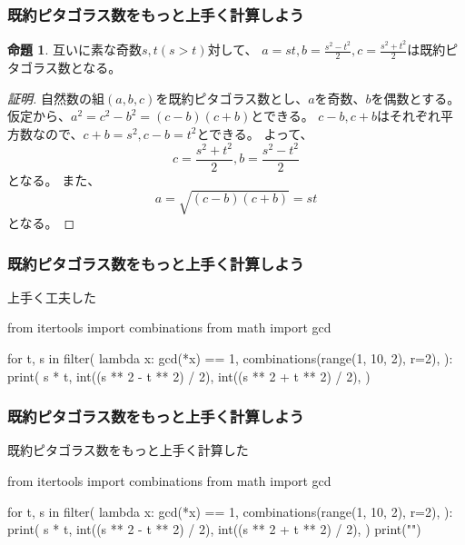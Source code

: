 \documentclass[dvipdfmx,11pt,notheorems]{beamer}
\theoremstyle{definition}
\newtheorem{proposition}{命題}
\begin{document}
\begin{frame}\frametitle{既約ピタゴラス数をもっと上手く計算しよう}

\begin{proposition}
互いに素な奇数$s, t (s > t)$対して、 $a = st, b = \displaystyle \frac{s^{2}-t^{2}}{2}, c = \displaystyle \frac{s^{2}+t^{2}}{2}$は既約ピタゴラス数となる。
\end{proposition}

\begin{proof}[証明]
自然数の組$(a, b, c)$を既約ピタゴラス数とし、$a$を奇数、$b$を偶数とする。
仮定から、$a^{2} = c^{2} -b^{2} = (c-b)(c+b)$とできる。
$c-b, c+b$はそれぞれ平方数なので、$c+b=s^{2}, c-b=t^{2}$とできる。
よって、
\begin{equation*}
c = \frac{s^{2} + t^{2}}{2}, b = \frac{s^{2} - t^{2}}{2}
\end{equation*}
となる。
また、
\begin{equation*}
a = \sqrt{(c-b)(c+b)} = st
\end{equation*}
となる。
\end{proof}

\end{frame}



\begin{frame}[fragile]\frametitle{既約ピタゴラス数をもっと上手く計算しよう}

\begin{block}{上手く工夫した}
\begin{pyverbatim}
from itertools import combinations
from math import gcd

for t, s in filter(
    lambda x: gcd(*x) == 1,
    combinations(range(1, 10, 2), r=2),
):
    print(
        s * t,
        int((s ** 2 - t ** 2) / 2),
        int((s ** 2 + t ** 2) / 2),
    )
\end{pyverbatim}
\end{block}

\end{frame}

\begin{frame}[fragile]\frametitle{既約ピタゴラス数をもっと上手く計算しよう}

\begin{block}{既約ピタゴラス数をもっと上手く計算した}
\begin{pycode}
from itertools import combinations
from math import gcd

for t, s in filter(
    lambda x: gcd(*x) == 1,
    combinations(range(1, 10, 2), r=2),
):
    print(
        s * t,
        int((s ** 2 - t ** 2) / 2),
        int((s ** 2 + t ** 2) / 2),
    )
    print("\n")
\end{pycode}
\end{block}

\end{frame}
\end{document}
